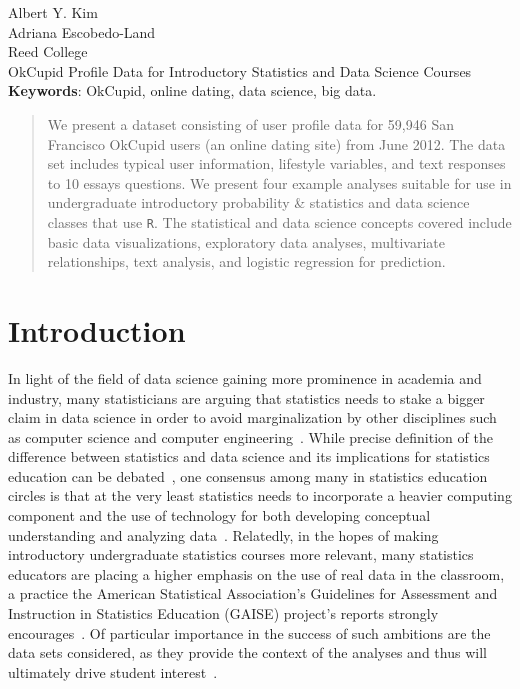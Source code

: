 \documentclass{article}\usepackage[]{graphicx}\usepackage[]{color}
\begin{document}
\noindent Albert Y. Kim\\
Adriana Escobedo-Land\\
Reed College\\
OkCupid Profile Data for Introductory Statistics and Data Science Courses\\

\noindent \textbf{Keywords}: OkCupid, online dating, data science, big data.

\begin{abstract}
We present a dataset consisting of user profile data for 59,946 San Francisco OkCupid users (an online dating site) from June 2012.  The data set includes typical user information, lifestyle variables, and text responses to 10 essays questions.  We present four example analyses suitable for use in undergraduate introductory probability \& statistics and data science classes that use \verb#R#.  The statistical and data science concepts covered include basic data visualizations, exploratory data analyses, multivariate relationships, text analysis, and logistic regression for prediction.
\end{abstract}










%
\section{Introduction}\label{intro}
%
In light of the field of data science gaining more prominence in academia and industry, many statisticians are arguing that statistics needs to stake a bigger claim in data science in order to avoid marginalization by other disciplines such as computer science and computer engineering~\cite{YU:2014,DAVIDSON:2014}.  While precise definition of the difference between statistics and data science and its implications for statistics education can be debated~\cite{WICKHAM:2014}, one consensus among many in statistics education circles is that at the very least statistics needs to incorporate a heavier computing component and the use of technology for both developing conceptual understanding and analyzing data~\cite{GAISE:05, NOLAN:LANG:2010}.  Relatedly, in the hopes of making introductory undergraduate statistics courses more relevant, many statistics educators are placing a higher emphasis on the use of real data in the classroom, a practice the American Statistical Association's Guidelines for Assessment and Instruction in Statistics Education (GAISE) project's reports strongly encourages~\cite{GAISE:05}.  Of particular importance in the success of such ambitions are the data sets considered, as they provide the context of the analyses and thus will ultimately drive student interest~\cite{GOULD:2010}.
\end{document}
